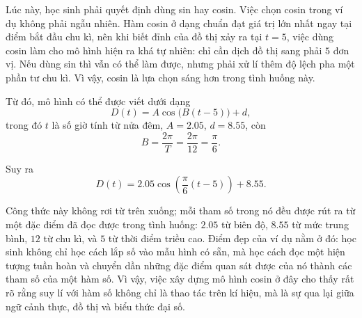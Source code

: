 {    Lúc này, học sinh phải quyết định dùng sin hay cosin. Việc chọn cosin trong ví dụ không phải ngẫu nhiên. Hàm cosin ở dạng chuẩn đạt giá trị lớn nhất ngay tại điểm bắt đầu chu kì, nên khi biết đỉnh của đồ thị xảy ra tại $t=5$, việc dùng cosin làm cho mô hình hiện ra khá tự nhiên: chỉ cần dịch đồ thị sang phải $5$ đơn vị. Nếu dùng sin thì vẫn có thể làm được, nhưng phải xử lí thêm độ lệch pha một phần tư chu kì. Vì vậy, cosin là lựa chọn sáng hơn trong tình huống này.

    Từ đó, mô hình có thể được viết dưới dạng
    $$
    D(t)=A\cos\bigl(B(t-5)\bigr)+d,
    $$
    trong đó $t$ là số giờ tính từ nửa đêm, $A=2.05$, $d=8.55$, còn
    $$
    B=\frac{2\pi}{T}=\frac{2\pi}{12}=\frac{\pi}{6}.
    $$

    Suy ra
    $$
    D(t)=2.05\cos\left(\frac{\pi}{6}(t-5)\right)+8.55.
    $$

    Công thức này không rơi từ trên xuống; mỗi tham số trong nó đều được rút ra từ một đặc điểm đã đọc được trong tình huống: $2.05$ từ biên độ, $8.55$ từ mức trung bình, $12$ từ chu kì, và $5$ từ thời điểm triều cao. Điểm đẹp của ví dụ nằm ở đó: học sinh không chỉ học cách lắp số vào mẫu hình có sẵn, mà học cách đọc một hiện tượng tuần hoàn và chuyển dần những đặc điểm quan sát được của nó thành các tham số của một hàm số. Vì vậy, việc xây dựng mô hình cosin ở đây cho thấy rất rõ rằng suy lí với hàm số không chỉ là thao tác trên kí hiệu, mà là sự qua lại giữa ngữ cảnh thực, đồ thị và biểu thức đại số.
  }

\TriPara
  {
  }
  {
  }{\NOTE{}}

\CloseGrid